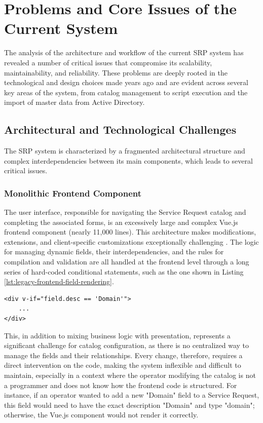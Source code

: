 \section{Problems and Core Issues of the Current System } \label{sec:as-is-issues}
The analysis of the architecture and workflow of the current SRP system has revealed a number of critical issues that compromise its scalability, maintainability, and reliability. These problems are deeply rooted in the technological and design choices made years ago and are evident across several key areas of the system, from catalog management to script execution and the import of master data from Active Directory.

\subsection{Architectural and Technological Challenges}

The SRP system is characterized by a fragmented architectural structure and complex interdependencies between its main components, which leads to several critical issues.

\subsubsection{Monolithic Frontend Component}
The user interface, responsible for navigating the Service Request catalog and completing the associated forms, is an excessively large and complex Vue.js frontend component (nearly 11,000 lines). This architecture makes modifications, extensions, and client-specific customizations exceptionally challenging \cite{benefits_issues_micro_frontends}. The logic for managing dynamic fields, their interdependencies, and the rules for compilation and validation are all handled at the frontend level through a long series of hard-coded conditional statements, such as the one shown in Listing \ref{lst:legacy-frontend-field-rendering}.

\begin{listing}[htbp]
\begin{verbatim}
<div v-if="field.desc == 'Domain'">
    ...
</div>
\end{verbatim}   
\caption{Example of field rendering logic in legacy monolithic frontend code}
\label{lst:legacy-frontend-field-rendering}
\end{listing}


This, in addition to mixing business logic with presentation, represents a significant challenge for catalog configuration, as there is no centralized way to manage the fields and their relationships. Every change, therefore, requires a direct intervention on the code, making the system inflexible and difficult to maintain, especially in a context where the operator modifying the catalog is not a programmer and does not know how the frontend code is structured. For instance, if an operator wanted to add a new "Domain" field to a Service Request, this field would need to have the exact description "Domain" and type "domain"; otherwise, the Vue.js component would not render it correctly.

